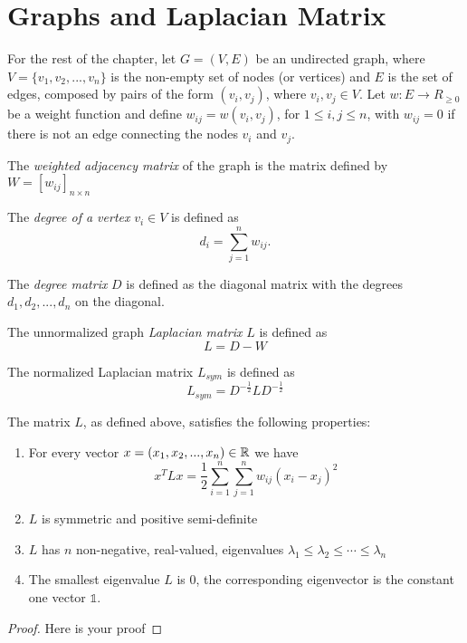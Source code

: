 \section{Graphs and Laplacian Matrix}
For the rest of the chapter, let $G=(V,E)$ be an undirected graph, where $V=\{v_1, v_2, ... , v_n\}$ is the non-empty set of nodes (or vertices) and $E$ is the set of edges, composed by pairs of the form $(v_i, v_j)$, where $v_i, v_j \in V$. Let $w:E\rightarrow R_{\geq0}$ be a weight function and define $w_{ij}=w(v_i,v_j)$, for $1\leq i,j\leq n$, with $w_{ij} = 0$ if there is not an edge connecting the nodes $v_i$ and $v_j$.

	The \textit{weighted adjacency matrix} of the graph is the matrix defined by $W=[w_{ij}]_{n\times n}$
	
	The \textit{degree of a vertex} $v_i\in V$ is defined as 
	\begin{displaymath}
		d_i = \sum_{j=1}^n w_{ij}.
	\end{displaymath}
	
	The \textit{degree matrix} $D$ is defined as the diagonal matrix with the degrees $d_1, d_2, ..., d_n$ on the diagonal.
	
	The unnormalized graph \textit{Laplacian matrix} $L$ is defined as 
	\begin{displaymath}
		L = D - W
	\end{displaymath}
	
	The normalized Laplacian matrix $L_{sym}$ is defined as
	\begin{displaymath}
		L_{sym} = D^{-\frac{1}{2}}LD^{-\frac{1}{2}}
	\end{displaymath}
	
\begin{proposition}
	The matrix $L$, as defined above, satisfies the following properties:
	\begin{enumerate}
		\item For every vector $x=(x_1,x_2, ..., x_n)\in \mathbb{R}$ we have 
		\begin{displaymath}
			x^TLx = \frac{1}{2}\sum_{i=1}^n\sum_{j=1}^n w_{ij}\left(x_i-x_j\right)^2
		\end{displaymath}
		\item $L$ is symmetric and positive semi-definite
		\item $L$ has $n$ non-negative, real-valued, eigenvalues $\lambda_1 \leq \lambda_2 \leq \cdots \leq \lambda_n$
		\item The smallest eigenvalue $L$ is $0$, the corresponding eigenvector is the constant one vector $\mathbb 1$.
	\end{enumerate}
\end{proposition}
\begin{proof}
	Here is your proof
\end{proof}

